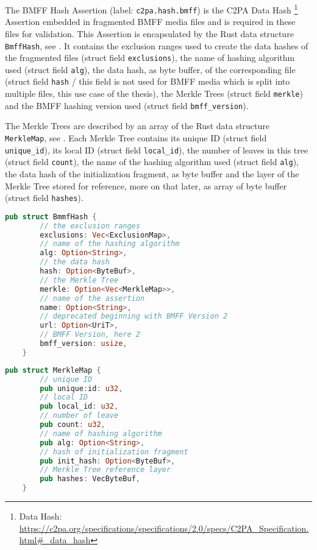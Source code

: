 The BMFF Hash Assertion (label: \texttt{c2pa.hash.bmff}) is the C2PA Data Hash \footnote{Data Hash: \url{https://c2pa.org/specifications/specifications/2.0/specs/C2PA_Specification.html\#_data_hash}} Assertion embedded in fragmented BMFF media files and is required in these files for validation. This Assertion is encapsulated by the Rust data structure \texttt{BmffHash}, see . It contains the exclusion ranges used to create the data hashes of the fragmented files (struct field \texttt{exclusions}), the name of hashing algorithm used (struct field \texttt{alg}), the data hash, as byte buffer, of the corresponding file (struct field \texttt{hash} / this field is not used for BMFF media which is split into multiple files, this use case of the thesis), the Merkle Trees (struct field \texttt{merkle}) and the BMFF hashing version used (struct field \texttt{bmff\_version}).

The Merkle Trees are described by an array of the Rust data structure \texttt{MerkleMap}, see . Each Merkle Tree contains its unique ID (struct field \texttt{unique\_id}), its local ID (struct field \texttt{local\_id}), the number of leaves in this tree (struct field \texttt{count}), the name of the hashing algorithm used (struct field \texttt{alg}), the data hash of the initialization fragment, as byte buffer and the layer of the Merkle Tree stored for reference, more on that later, as array of byte buffer (struct field \texttt{hashes}).

\begin{minipage}{\linewidth}
\begin{lstlisting}[caption={BmffHash Rust Definition}, label=code:bmff_hash, language=Rust, captionpos=b]
    pub struct BmmfHash {
        // the exclusion ranges
        exclusions: Vec<ExclusionMap>,
        // name of the hashing algorithm
        alg: Option<String>,
        // the data hash
        hash: Option<ByteBuf>,
        // the Merkle Tree
        merkle: Option<Vec<MerkleMap>>,
        // name of the assertion
        name: Option<String>,
        // deprecated beginning with BMFF Version 2
        url: Option<UriT>,
        // BMFF Version, here 2
        bmff_version: usize,
    }
\end{lstlisting}
\end{minipage}

\begin{minipage}{\linewidth}
\begin{lstlisting}[caption={MerkleMap Rust Definition}, label=code:merkle_map, language=Rust, captionpos=b]
    pub struct MerkleMap {
        // unique ID
        pub unique:id: u32,
        // local ID
        pub local_id: u32,
        // number of leave
        pub count: u32,
        // name of hashing algorithm
        pub alg: Option<String>,
        // hash of initialization fragment
        pub init_hash: Option<ByteBuf>,
        // Merkle Tree reference layer
        pub hashes: VecByteBuf,
    }
\end{lstlisting}
\end{minipage}

